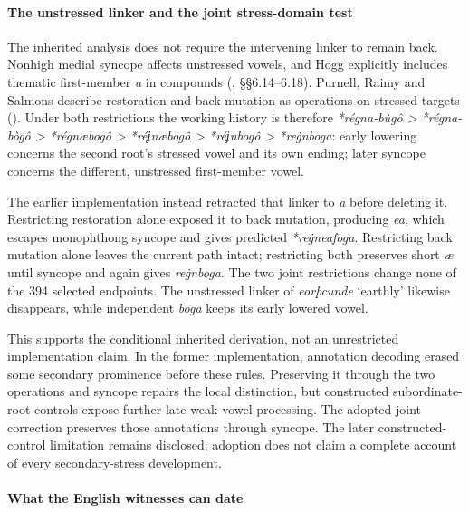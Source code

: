\documentclass[
  british,
  a4paper,
]{article}
\newcounter{none} %
\begin{document}
\paragraph{The unstressed linker and the joint stress-domain
test}\label{the-unstressed-linker-and-the-joint-stress-domain-test}

The inherited analysis does not require the intervening linker to remain
back. Nonhigh medial syncope affects unstressed vowels, and Hogg
explicitly includes thematic first-member \emph{a} in compounds
(, §§6.14--6.18).
Purnell, Raimy and Salmons describe restoration and back mutation as
operations on stressed targets
().
Under both restrictions the working history is therefore
\emph{*régna-bùgô > *régna-bògô > *régnæbogô > *réʝnæbogô
> *réʝnbogô > *reġnboga}: early lowering concerns the second root's
stressed vowel and its own ending; later syncope concerns the different,
unstressed first-member vowel.

The earlier implementation instead retracted that linker to \emph{a}
before deleting it. Restricting restoration alone exposed it to back
mutation, producing \emph{ea}, which escapes monophthong syncope and
gives predicted \emph{*reġneafoga}. Restricting back mutation alone
leaves the current path intact; restricting both preserves short
\emph{æ} until syncope and again gives \emph{reġnboga}. The two joint
restrictions change none of the 394 selected endpoints. The unstressed
linker of \emph{eorþcunde} `earthly' likewise disappears, while
independent \emph{boga} keeps its early lowered vowel.

This supports the conditional inherited derivation, not an unrestricted
implementation claim. In the former implementation, annotation decoding
erased some secondary prominence before these rules. Preserving it
through the two operations and syncope repairs the local distinction,
but constructed subordinate-root controls expose further late weak-vowel
processing. The adopted joint correction preserves those annotations
through syncope. The later constructed-control limitation remains
disclosed; adoption does not claim a complete account of every
secondary-stress development.

\paragraph{What the English witnesses can
date}\label{what-the-english-witnesses-can-date}
\end{document}
